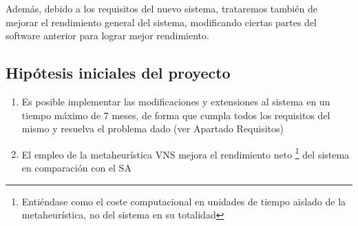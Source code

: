 Además, debido a los requisitos del nuevo sistema, trataremos también de mejorar el rendimiento general del sistema, modificando ciertas partes del software anterior para lograr mejor rendimiento.

\subsection{Hipótesis iniciales del proyecto}
\label{sec:Hipotesis}
\begin{enumerate}[label={H\arabic*}]
	\item \label{H1} Es posible implementar las modificaciones y extensiones al sistema en un tiempo máximo de 7 meses, de forma que cumpla todos los requisitos del mismo y resuelva el problema dado (ver Apartado Requisitos) %
	\item \label{H2} El empleo de la metaheurística VNS mejora el rendimiento neto
	\footnote{Entiéndase como el coste computacional en unidades de tiempo aislado de la metaheurística, no del sistema en su totalidad}
	del sistema en comparación con el SA
\end{enumerate}

%
%
\glsaddall
\printglossary[title={Definiciones, acrónimos y abreviaturas}]
%
%
%